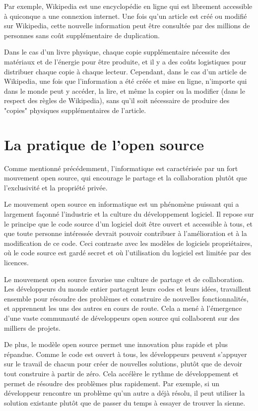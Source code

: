 Par exemple, Wikipedia est une encyclopédie en ligne qui est librement accessible à quiconque a une connexion internet. Une fois qu'un article est créé ou modifié sur Wikipedia, cette nouvelle information peut être consultée par des millions de personnes sans coût supplémentaire de duplication.

Dans le cas d'un livre physique, chaque copie supplémentaire nécessite des matériaux et de l'énergie pour être produite, et il y a des coûts logistiques pour distribuer chaque copie à chaque lecteur. Cependant, dans le cas d'un article de Wikipedia, une fois que l'information a été créée et mise en ligne, n'importe qui dans le monde peut y accéder, la lire, et même la copier ou la modifier (dans le respect des règles de Wikipedia), sans qu'il soit nécessaire de produire des "copies" physiques supplémentaires de l'article.


\section{La pratique de l'open source } Comme mentionné précédemment, l'informatique est caractérisée par un fort mouvement open source, qui encourage le partage et la collaboration plutôt que l'exclusivité et la propriété privée.

Le mouvement open source en informatique est un phénomène puissant qui a largement façonné l'industrie et la culture du développement logiciel. Il repose sur le principe que le code source d'un logiciel doit être ouvert et accessible à tous, et que toute personne intéressée devrait pouvoir contribuer à l'amélioration et à la modification de ce code. Ceci contraste avec les modèles de logiciels propriétaires, où le code source est gardé secret et où l'utilisation du logiciel est limitée par des licences.

Le mouvement open source favorise une culture de partage et de collaboration. Les développeurs du monde entier partagent leurs codes et leurs idées, travaillent ensemble pour résoudre des problèmes et construire de nouvelles fonctionnalités, et apprennent les uns des autres en cours de route. Cela a mené à l'émergence d'une vaste communauté de développeurs open source qui collaborent sur des milliers de projets.

De plus, le modèle open source permet une innovation plus rapide et plus répandue. Comme le code est ouvert à tous, les développeurs peuvent s'appuyer sur le travail de chacun pour créer de nouvelles solutions, plutôt que de devoir tout construire à partir de zéro. Cela accélère le rythme de développement et permet de résoudre des problèmes plus rapidement. Par exemple, si un développeur rencontre un problème qu'un autre a déjà résolu, il peut utiliser la solution existante plutôt que de passer du temps à essayer de trouver la sienne.

